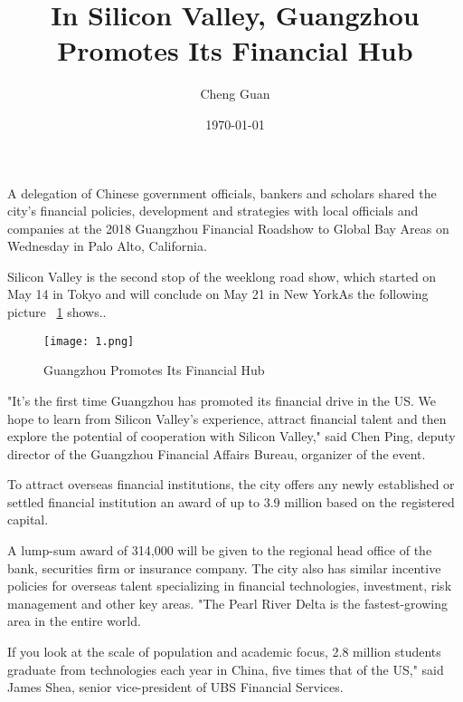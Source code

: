 \documentclass[a4paper,twocolumn]{article}
\title{In Silicon Valley, Guangzhou Promotes Its Financial Hub}
\author{Cheng Guan}
\date{\today}
\begin{document}
\maketitle
\balance
A delegation of Chinese government officials, bankers and scholars shared the city's financial policies,
development and strategies with local officials and companies at the 2018 Guangzhou
Financial Roadshow to Global Bay Areas on Wednesday in Palo Alto, California.

Silicon Valley is the second stop of the weeklong road show,
which started on May 14 in Tokyo and will conclude on May 21 in New YorkAs the following picture ~\ref{fig1} shows..

\begin{figure}[H]
\centering
\texttt{[image: 1.png]}
\caption{Guangzhou Promotes Its Financial Hub}
\label{fig1}
\end{figure}

"It's the first time Guangzhou has promoted its financial drive in the US.
We hope to learn from Silicon Valley's experience, attract financial talent and
then explore the potential of cooperation with Silicon Valley," said Chen Ping,
deputy director of the Guangzhou Financial Affairs Bureau, organizer of the event\cite{test2}.

To attract overseas financial institutions,
the city offers any newly established or settled financial institution an award of up to 3.9 million based on the registered capital.

A lump-sum award of 314,000 will be given to the regional head office of the bank, securities firm or insurance company. The city also has similar incentive policies for overseas talent specializing in financial technologies, investment, risk management and other key areas.
"The Pearl River Delta is the fastest-growing area in the entire world.

If you look at the scale of population and academic focus, 2.8 million students graduate from technologies each year in China, five times that of the US,"
said James Shea, senior vice-president of UBS Financial Services.


\end{document}
